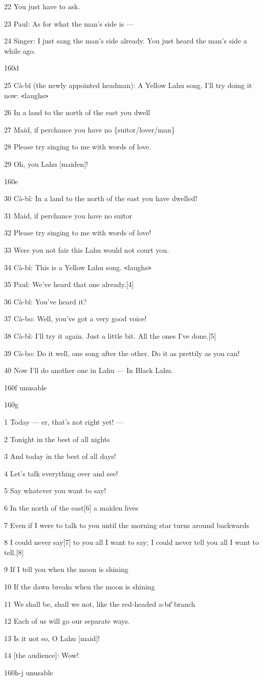 {22 You just have to ask.}

{23 Paul: As for what the man's side is ---}

{24 Singer: I just sang the man's side already. You just heard the man's
side a while ago.}

{160d}

{25 Cà-bî (the newly appointed headman): A Yellow Lahu song. I'll try
doing it now: \texttt{<}laughs\texttt{>}}

{26 In a land to the north of the east you dwell}

{27 Maid, if perchance you have no \{suitor/lover/man\}}

{28 Please try singing to me with words of love.}

{29 Oh, you Lahu [maiden]!}

{160e}

{30 Cà-bî: In a land to the north of the east you have dwelled!}

{31 Maid, if perchance you have no suitor}

{32 Please try singing to me with words of love!}

{33 Were you not fair this Lahu would not court you.}

{34 Cà-bî: This is a Yellow Lahu song. \texttt{<}laughs\texttt{>}}

{35 Paul: We've heard that one already.[4]}

{36 Cà-bî: You've heard it?}

{37 Cà-bo: Well, you've got a very good voice!}

{38 Cà-bî: I'll try it again. Just a little bit. All the ones I've done.[5]}

{39 Cà-bo: Do it well, one song after the other. Do it as prettily as you
can!}

{40 Now I'll do another one in Lahu --- In Black Lahu.}

{160f unusable}

{160g}

{1 Today --- er, that's not right yet! ---}

{2 Tonight in the best of all nights}

{3 And today in the best of all days!}

{4 Let's talk everything over and see!}

{5 Say whatever you want to say!}

{6 In the north of the east[6] a maiden lives}

{7 Even if I were to talk to you until the morning star turns around backwards}

{8 I could never say[7] to you all I want to say; I could never tell you
all I want to tell.[8]}

{9 If I tell you when the moon is shining}

{10 If the dawn breaks when the moon is shining}

{11 We shall be, shall we not, like the red-headed a-bɛ̂ branch}

{12 Each of us will go our separate ways.}

{13 Is it not so, O Lahu [maid]!}

{14 [the audience]: Wow!}

{160h-j unusable}

